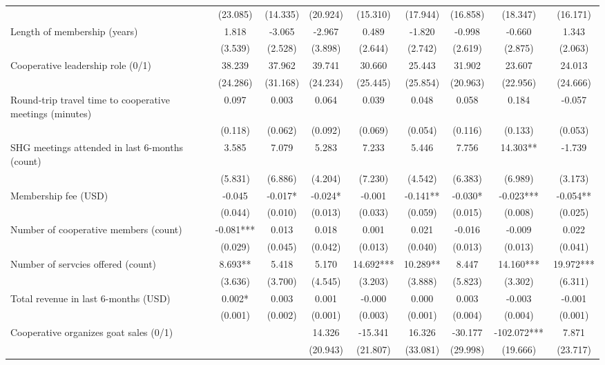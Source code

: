\documentclass[11pt]{article}
\begin{document}
\begin{landscape}
\begin{table}[H]
{\begin{tabularx}{1.8\linewidth}{lcccccccc}
 & (23.085) & (14.335) & (20.924) & (15.310) & (17.944) & (16.858) & (18.347) & (16.171) \\
Length of membership (years) & 1.818 & -3.065 & -2.967 & 0.489 & -1.820 & -0.998 & -0.660 & 1.343 \\
 & (3.539) & (2.528) & (3.898) & (2.644) & (2.742) & (2.619) & (2.875) & (2.063) \\
Cooperative leadership role (0/1) & 38.239 & 37.962 & 39.741 & 30.660 & 25.443 & 31.902 & 23.607 & 24.013 \\
 & (24.286) & (31.168) & (24.234) & (25.445) & (25.854) & (20.963) & (22.956) & (24.666) \\
Round-trip travel time to cooperative meetings (minutes) & 0.097 & 0.003 & 0.064 & 0.039 & 0.048 & 0.058 & 0.184 & -0.057 \\
 & (0.118) & (0.062) & (0.092) & (0.069) & (0.054) & (0.116) & (0.133) & (0.053) \\
SHG meetings attended in last 6-months (count) & 3.585 & 7.079 & 5.283 & 7.233 & 5.446 & 7.756 & 14.303** & -1.739 \\
 & (5.831) & (6.886) & (4.204) & (7.230) & (4.542) & (6.383) & (6.989) & (3.173) \\
Membership fee (USD) & -0.045 & -0.017* & -0.024* & -0.001 & -0.141** & -0.030* & -0.023*** & -0.054** \\
 & (0.044) & (0.010) & (0.013) & (0.033) & (0.059) & (0.015) & (0.008) & (0.025) \\
Number of cooperative members (count) & -0.081*** & 0.013 & 0.018 & 0.001 & 0.021 & -0.016 & -0.009 & 0.022 \\
 & (0.029) & (0.045) & (0.042) & (0.013) & (0.040) & (0.013) & (0.013) & (0.041) \\
Number of servcies offered (count) & 8.693** & 5.418 & 5.170 & 14.692*** & 10.289** & 8.447 & 14.160*** & 19.972*** \\
 & (3.636) & (3.700) & (4.545) & (3.203) & (3.888) & (5.823) & (3.302) & (6.311) \\
Total revenue in last 6-months (USD) & 0.002* & 0.003 & 0.001 & -0.000 & 0.000 & 0.003 & -0.003 & -0.001 \\
 & (0.001) & (0.002) & (0.001) & (0.003) & (0.001) & (0.004) & (0.004) & (0.001) \\
Cooperative organizes goat sales (0/1) &  &  & 14.326 & -15.341 & 16.326 & -30.177 & -102.072*** & 7.871 \\
 &  &  & (20.943) & (21.807) & (33.081) & (29.998) & (19.666) & (23.717) \\

\end{tabularx}}
\end{table}
\end{landscape}
\end{document}
